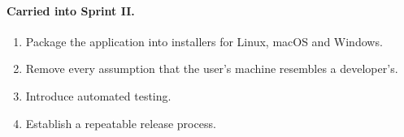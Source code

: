 \documentclass[11pt,a4paper]{article}
\begin{document}
\paragraph{Carried into Sprint II.}

\begin{enumerate}[leftmargin=*]
  \item Package the application into installers for Linux, macOS and Windows.
  \item Remove every assumption that the user's machine resembles a developer's.
  \item Introduce automated testing.
  \item Establish a repeatable release process.
\end{enumerate}
\end{document}
